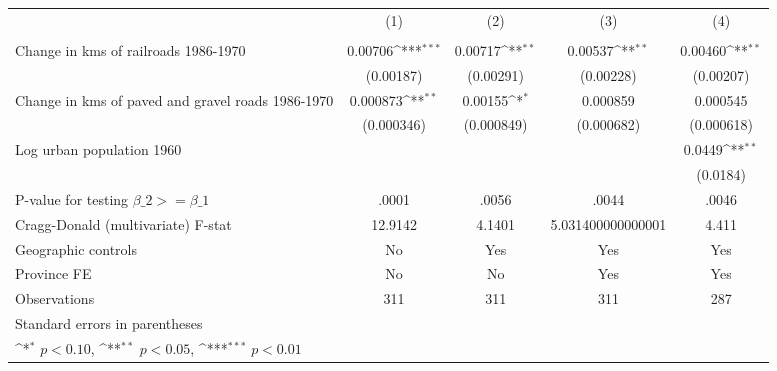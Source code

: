 {
\def\sym#1{\ifmmode^{#1}\else\(^{#1}\)\fi}
\begin{tabular}{l*{4}{c}}
\hline\hline
                &\multicolumn{1}{c}{(1)}&\multicolumn{1}{c}{(2)}&\multicolumn{1}{c}{(3)}&\multicolumn{1}{c}{(4)}\\
                &\multicolumn{1}{c}{}&\multicolumn{1}{c}{}&\multicolumn{1}{c}{}&\multicolumn{1}{c}{}\\
\hline
Change in kms of railroads 1986-1970&  0.00706\sym{***}&  0.00717\sym{**} &  0.00537\sym{**} &  0.00460\sym{**} \\
                &(0.00187)         &(0.00291)         &(0.00228)         &(0.00207)         \\
[1em]
Change in kms of paved and gravel roads 1986-1970& 0.000873\sym{**} &  0.00155\sym{*}  & 0.000859         & 0.000545         \\
                &(0.000346)         &(0.000849)         &(0.000682)         &(0.000618)         \\
[1em]
Log urban population 1960&                  &                  &                  &   0.0449\sym{**} \\
                &                  &                  &                  & (0.0184)         \\
\hline
P-value for testing $\beta\_{2} >= \beta\_{1}$&    .0001         &    .0056         &    .0044         &    .0046         \\
Cragg-Donald (multivariate) F-stat&  12.9142         &   4.1401         &5.031400000000001         &    4.411         \\
Geographic controls&       No         &      Yes         &      Yes         &      Yes         \\
Province FE     &       No         &       No         &      Yes         &      Yes         \\
Observations    &      311         &      311         &      311         &      287         \\
\hline\hline
\multicolumn{5}{l}{\footnotesize Standard errors in parentheses}\\
\multicolumn{5}{l}{\footnotesize \sym{*} \(p<0.10\), \sym{**} \(p<0.05\), \sym{***} \(p<0.01\)}\\
\end{tabular}
}
